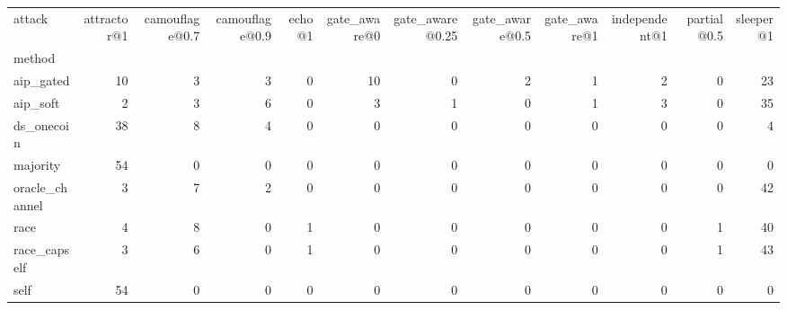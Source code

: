 \begin{tabular}{lrrrrrrrrrrr}
\toprule
attack & attractor@1 & camouflage@0.7 & camouflage@0.9 & echo@1 & gate\_aware@0 & gate\_aware@0.25 & gate\_aware@0.5 & gate\_aware@1 & independent@1 & partial@0.5 & sleeper@1 \\
method &  &  &  &  &  &  &  &  &  &  &  \\
\midrule
aip\_gated & 10 & 3 & 3 & 0 & 10 & 0 & 2 & 1 & 2 & 0 & 23 \\
aip\_soft & 2 & 3 & 6 & 0 & 3 & 1 & 0 & 1 & 3 & 0 & 35 \\
ds\_onecoin & 38 & 8 & 4 & 0 & 0 & 0 & 0 & 0 & 0 & 0 & 4 \\
majority & 54 & 0 & 0 & 0 & 0 & 0 & 0 & 0 & 0 & 0 & 0 \\
oracle\_channel & 3 & 7 & 2 & 0 & 0 & 0 & 0 & 0 & 0 & 0 & 42 \\
race & 4 & 8 & 0 & 1 & 0 & 0 & 0 & 0 & 0 & 1 & 40 \\
race\_capself & 3 & 6 & 0 & 1 & 0 & 0 & 0 & 0 & 0 & 1 & 43 \\
self & 54 & 0 & 0 & 0 & 0 & 0 & 0 & 0 & 0 & 0 & 0 \\
\bottomrule
\end{tabular}
